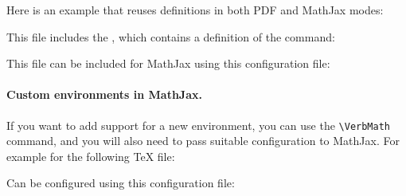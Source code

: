 Here is an example that reuses definitions in both PDF and MathJax modes:


This file includes the , which contains a definition of the  command:

\begin{texsource}
\newcommand\myspace{\quad}
\end{texsource}

This file can be included for MathJax using this configuration file:

\begin{texsource}

\EndPreamble
\end{texsource}





\paragraph{Custom environments in MathJax.}\label{sec:mathjax_env}

If you want to add support for a new environment, you can use the \verb|\VerbMath| command, and you will
also need to pass suitable configuration to MathJax. For example for the following TeX file:


Can be configured using this configuration file:

\begin{texsource}
 
\EndPreamble
\end{texsource}

